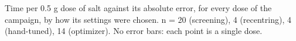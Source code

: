  Time per 0.5 g dose of salt against its absolute error, for every dose of the campaign, by how its settings were chosen. n = 20 (screening), 4 (recentring), 4 (hand-tuned), 14 (optimizer). No error bars: each point is a single dose.
